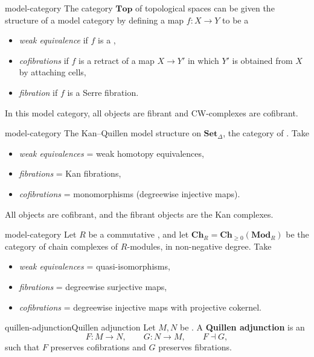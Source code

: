 \begin{example}{model-category}
    The category $\textbf{Top}$ of topological spaces can be given the structure of a model category by defining a map $f : X \to Y$ to be a
    \begin{itemize}
        \item \textit{weak equivalence} if $f$ is a ,
        \item \textit{cofibrations} if $f$ is a retract of a map $X \to Y'$ in which $Y'$ is obtained from $X$ by attaching cells,
        \item \textit{fibration} if $f$ is a Serre fibration.
    \end{itemize}
    In this model category, all objects are fibrant and CW-complexes are cofibrant.
\end{example}

\begin{example}{model-category}
    The Kan--Quillen model structure on $\textbf{Set}_\Delta$, the category of . Take
    \begin{itemize}
        \item \textit{weak equivalences} = weak homotopy equivalences,
        \item \textit{fibrations} = Kan fibrations,
        \item \textit{cofibrations} = monomorphisms (degreewise injective maps).
    \end{itemize}
    All objects are cofibrant, and the fibrant objects are the Kan complexes.
\end{example}

\begin{example}{model-category}
    Let $R$ be a commutative , and let $\textbf{Ch}_R = \textbf{Ch}_{\ge 0}(\textbf{Mod}_R)$ be the category of chain complexes of $R$-modules, in non-negative degree. Take
    \begin{itemize}
        \item \textit{weak equivalences} = quasi-isomorphisms,
        \item \textit{fibrations} = degreewise surjective maps,
        \item \textit{cofibrations} = degreewise injective maps with projective cokernel.
    \end{itemize}
\end{example}

\begin{topic}{quillen-adjunction}{Quillen adjunction}
    Let $M, N$ be . A \textbf{Quillen adjunction} is an 
    \[ F : M \to N, \qquad G : N \to M, \qquad F \dashv G , \]
    such that $F$ preserves cofibrations and $G$ preserves fibrations.
\end{topic}

